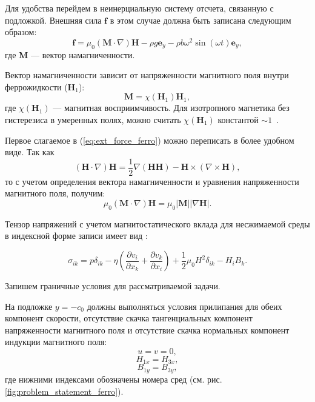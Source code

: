 \documentclass[12pt,a4paper]{article}
\begin{document}
Для удобства перейдем в неинерциальную систему отсчета, связанную с подложкой. Внешняя сила $\mathbf{f}$ в этом случае должна быть записана следующим образом:
\begin{equation} \label{eq:ext_force_ferro}
	\mathbf{f}
	=
	\mu_0(\mathbf{M} \cdot \nabla)\mathbf{H}
	-
	\rho g \mathbf{e}_y
	-
	\rho b \omega^2 \sin(\omega t)\mathbf{e}_y,
\end{equation}
где $\mathbf{M}$ --- вектор намагниченности. 

Вектор намагниченности зависит от напряженности магнитного поля
внутри феррожидкости ($\mathbf{H}_1$):
\begin{equation*}
	\mathbf{M} = \chi(\mathbf{H}_1)\mathbf{H}_1,
\end{equation*}
где $\chi(\mathbf{H}_1)$ --- магнитная восприимчивость. Для изотропного магнетика без гистерезиса в умеренных полях, можно считать $\chi(\mathbf{H}_1)$ константой $\sim 1$~\cite{Berkovskiy1989, Korovin2013}.

Первое слагаемое в (\ref{eq:ext_force_ferro}) можно переписать в более удобном виде. Так как 
\begin{equation*}
   ( \mathbf{H} \cdot \nabla   )\mathbf{H} = \frac{1}{2} \nabla(\mathbf{H}\mathbf{H}) - \mathbf{H} \times (\nabla \times \mathbf{H}),
\end{equation*}
то с учетом определения вектора намагниченности и уравнения напряженности магнитного поля, получим:
\begin{equation*}
	\mu_0(\mathbf{M} \cdot \nabla)\mathbf{H}
	=
	\mu_0|\mathbf{M}||\nabla\mathbf{H}|.
\end{equation*}

Тензор напряжений с учетом магнитостатического вклада для несжимаемой среды в индексной форме записи имеет вид \cite{Cowley1989, Berkovskiy1989}: 

\begin{equation}\label{eq:viscous_ferro}
	\sigma_{ik}
	=
	p\delta_{ik}
	-
	\eta
	\left(
	\frac{\partial v_i}{\partial x_k}
	+
	\frac{\partial v_k}{\partial x_i}
	\right)
	+
	\frac{1}{2}\mu_0 H^2\delta_{ik}
	-
	H_i B_k.
\end{equation}

Запишем граничные условия для рассматриваемой задачи. 

На подложке $y=-c_0$ должны выполняться условия прилипания для обеих компонент скорости, отсутствие скачка тангенциальных компонент напряженности магнитного поля и отсутствие
скачка нормальных компонент индукции магнитного поля:
\begin{equation}
		u = v = 0, 
\end{equation}
\begin{equation}
		H_{1x} = H_{3x}, 
\end{equation}
\begin{equation}
		B_{1y} = B_{3y},
\end{equation}
где нижними индексами обозначены номера сред (см. рис. \ref{fig:problem_statement_ferro}).
\end{document}

